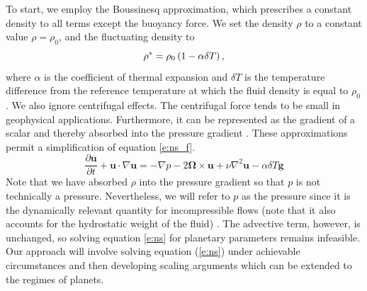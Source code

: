 To start, we employ the Boussinesq approximation, which prescribes a constant density to all terms except the buoyancy force. We set the density $\rho$ to a constant value $\rho  = \rho_{0}$, and the fluctuating density to
\[\rho^{*} = \rho_{0}\left ( 1-\alpha \delta T\right ), \]
where $\alpha$ is the coefficient of thermal expansion and $\delta T$ is the temperature difference from the reference temperature at which the fluid density is equal to $\rho_{0}$.
We also ignore centrifugal effects. The centrifugal force tends to be small in geophysical applications. Furthermore, it can be represented as the gradient of a scalar and thereby absorbed into the pressure gradient \citep[e.g.][]{sC61}. 
These approximations permit a simplification of equation \eqref{e:ns_f}.
\begin{equation}
	\frac{\partial \mathbf{u}}{\partial t} + \mathbf{u}\cdot \nabla \mathbf{u} = -\nabla p- 2 \mathbf{\Omega}\times\mathbf{u} + \nu\nabla^{2}\mathbf{u}- \alpha \delta T \mathbf{g}
	\label{e:ns}
\end{equation}
 Note that we have absorbed $\rho$ into the pressure gradient so that $p$ is not technically a pressure. Nevertheless, we will refer to $p$ as the pressure since it is the dynamically relevant quantity for incompressible flows (note that it also accounts for the hydrostatic weight of the fluid) \citep{sC61}.
The advective term, however, is unchanged, so solving equation \eqref{e:ns} for planetary parameters remains infeasible.
Our approach will involve solving equation (\ref{e:ns}) under achievable circumstances and then developing scaling arguments which can be extended to the regimes of planets.

